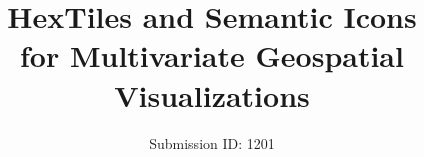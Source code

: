 

\title[HexTiles and Semantic Icons for Multivariate Geospatial Visualizations]%
      {HexTiles and Semantic Icons\\ for Multivariate Geospatial Visualizations}

\author[Submission ID]{Submission ID: 1201}

%




\usepackage{amsfonts}
\usepackage{amsmath}
\usepackage{wrapfig}
\usepackage{cleveref}
\usepackage{subcaption}
\usepackage{tabularx}
\usepackage{multirow}

